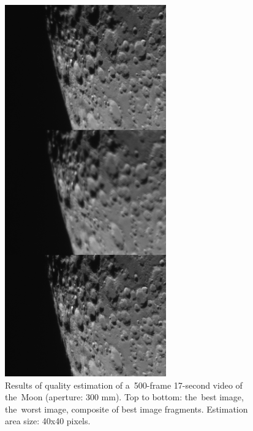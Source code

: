 \documentclass[12pt]{article}
\begin{document}
\begin{figure}[H]
\centering
\includegraphics[width=0.62\textwidth]{quality_moon.png}
\caption{Results of quality estimation of a~500-frame 17-second video of the~Moon (aperture: 300 mm). Top to bottom:
the~best image, the~worst image, composite of best image fragments. Estimation area size: 40x40 pixels.}
\label{fig:quality_moon}
\end{figure}
\end{document}
